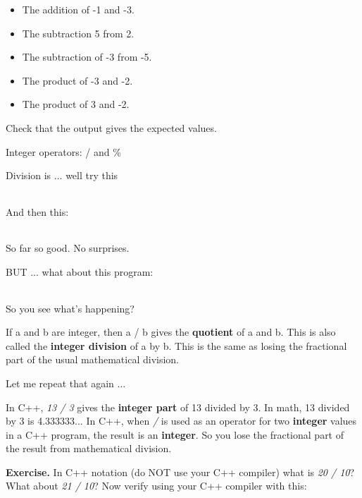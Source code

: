 \documentclass[
]{article}
\providecommand{\tightlist}{%
  \setlength{\itemsep}{0pt}\setlength{\parskip}{0pt}}
\begin{document}
\begin{itemize}
\tightlist
\item
  The addition of -1 and -3.
\item
  The subtraction 5 from 2.
\item
  The subtraction of -3 from -5.
\item
  The product of -3 and -2.
\item
  The product of 3 and -2.
\end{itemize}

Check that the output gives the expected values.

Integer operators: / and \%

Division is ... well try this

\begin{longtable}[]{@{}@{}}
\toprule
\endhead
\bottomrule
\end{longtable}

And then this:

\begin{longtable}[]{@{}@{}}
\toprule
\endhead
\bottomrule
\end{longtable}

So far so good. No surprises.

BUT ... what about this program:

\begin{longtable}[]{@{}@{}}
\toprule
\endhead
\bottomrule
\end{longtable}

So you see what's happening?

If a and b are integer, then a / b gives the \textbf{quotient} of a and
b. This is also called the \textbf{integer division} of a by b. This is
the same as losing the fractional part of the usual mathematical
division.

Let me repeat that again ...

In C++, \emph{13 / 3} gives the \textbf{integer part} of 13 divided by
3. In math, 13 divided by 3 is 4.333333... In C++, when \emph{/} is used
as an operator for two \textbf{integer} values in a C++ program, the
result is an \textbf{integer}. So you lose the fractional part of the
result from mathematical division.

\textbf{Exercise.} In C++ notation (do NOT use your C++ compiler) what
is \emph{20 / 10}? What about \emph{21 / 10}? Now verify using your C++
compiler with this:

\begin{longtable}[]{@{}@{}}
\toprule
\endhead
\bottomrule
\end{longtable}
\end{document}
